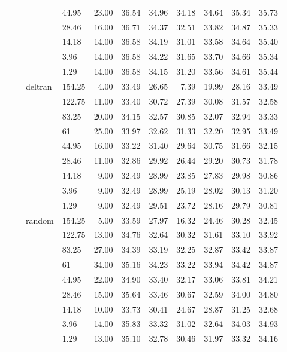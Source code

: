 \begin{longtable}{llllrrrrrrr}
   &  &  & 44.95 & 23.00 & 36.54 & 34.96 & 34.18 & 34.64 & 35.34 & 35.73 \\ 
   &  &  & 28.46 & 16.00 & 36.71 & 34.37 & 32.51 & 33.82 & 34.87 & 35.33 \\ 
   &  &  & 14.18 & 14.00 & 36.58 & 34.19 & 31.01 & 33.58 & 34.64 & 35.40 \\ 
   &  &  & 3.96 & 14.00 & 36.58 & 34.22 & 31.65 & 33.70 & 34.66 & 35.34 \\ 
   &  &  & 1.29 & 14.00 & 36.58 & 34.15 & 31.20 & 33.56 & 34.61 & 35.44 \\ 
   &  & deltran & 154.25 & 4.00 & 33.49 & 26.65 & 7.39 & 19.99 & 28.16 & 33.49 \\ 
   &  &  & 122.75 & 11.00 & 33.40 & 30.72 & 27.39 & 30.08 & 31.57 & 32.58 \\ 
   &  &  & 83.25 & 20.00 & 34.15 & 32.57 & 30.85 & 32.07 & 32.94 & 33.33 \\ 
   &  &  & 61 & 25.00 & 33.97 & 32.62 & 31.33 & 32.20 & 32.95 & 33.49 \\ 
   &  &  & 44.95 & 16.00 & 33.22 & 31.40 & 29.64 & 30.75 & 31.66 & 32.15 \\ 
   &  &  & 28.46 & 11.00 & 32.86 & 29.92 & 26.44 & 29.20 & 30.73 & 31.78 \\ 
   &  &  & 14.18 & 9.00 & 32.49 & 28.99 & 23.85 & 27.83 & 29.98 & 30.86 \\ 
   &  &  & 3.96 & 9.00 & 32.49 & 28.99 & 25.19 & 28.02 & 30.13 & 31.20 \\ 
   &  &  & 1.29 & 9.00 & 32.49 & 29.51 & 23.72 & 28.16 & 29.79 & 30.81 \\ 
   &  & random & 154.25 & 5.00 & 33.59 & 27.97 & 16.32 & 24.46 & 30.28 & 32.45 \\ 
   &  &  & 122.75 & 13.00 & 34.76 & 32.64 & 30.32 & 31.61 & 33.10 & 33.92 \\ 
   &  &  & 83.25 & 27.00 & 34.39 & 33.19 & 32.25 & 32.87 & 33.42 & 33.87 \\ 
   &  &  & 61 & 34.00 & 35.16 & 34.23 & 33.22 & 33.94 & 34.42 & 34.87 \\ 
   &  &  & 44.95 & 22.00 & 34.90 & 33.40 & 32.17 & 33.06 & 33.81 & 34.21 \\ 
   &  &  & 28.46 & 15.00 & 35.64 & 33.46 & 30.67 & 32.59 & 34.00 & 34.80 \\ 
   &  &  & 14.18 & 10.00 & 33.73 & 30.41 & 24.67 & 28.87 & 31.25 & 32.68 \\ 
   &  &  & 3.96 & 14.00 & 35.83 & 33.32 & 31.02 & 32.64 & 34.03 & 34.93 \\ 
   &  &  & 1.29 & 13.00 & 35.10 & 32.78 & 30.46 & 31.97 & 33.32 & 34.16 \\ 

\end{longtable}
